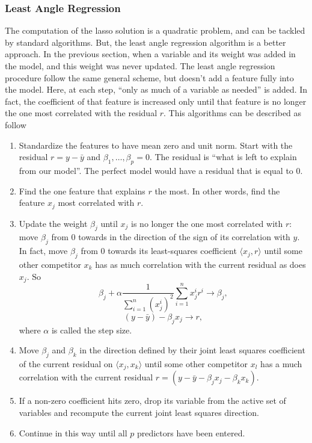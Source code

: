 \documentclass[a4paper,12pt]{article}
\begin{document}
\subsubsection{Least Angle Regression}
The computation of the lasso solution is a quadratic problem, and can be tackled by standard algorithms. But, the least angle regression algorithm is a better approach. In the previous section, when a variable and its weight was added in the model, and this weight was never updated. The least angle regression procedure follow the same general scheme, but doesn't add a feature fully into the model. Here, at each step, ``only as much of a variable as needed'' is added. In fact, the coefficient of that feature is increased only until that feature is no longer the one most correlated with the residual $r$. This algorithms can be described as follow
\begin{enumerate}
\item Standardize the features to have mean zero and unit norm. Start with the residual $r = y - \bar{y}$ and $\beta_1, \ldots, \beta_p = 0$. The residual is ``what is left to explain from our model''. The perfect model would have a residual that is equal to $0$.
\item Find the one feature that explains $r$ the most. In other words, find the feature $x_j$ most correlated with $r$.
\item Update the weight $\beta_j$ until $x_j$ is no longer the one most correlated with $r$: move $\beta_j$ from $0$ towards in the direction of the sign of its correlation with $y$. In fact, move $\beta_j$ from $0$ towards its least-squares coefficient $\langle x_j, r \rangle$ until some other competitor $x_k$ has as much correlation with the current residual as does $x_j$. So
\[ \beta_j + \alpha \frac{1}{\sum_{i=1}^n (x_j^i)^2} \sum_{i=1}^n x_j^i r^i \to \beta_j,\]
\[ (y - \bar{y}) - \beta_j x_j \to r,\]
where $\alpha$ is called the step size.
\item Move $\beta_j$ and $\beta_k$ in the direction defined by their joint least squares coefficient of the current residual on $\langle x_j, x_k \rangle$ until some other competitor $x_l$ has a much correlation with the current residual $r = (y-\bar{y} - \beta_j x_j - \beta_k x_k)$.
\item If a non-zero coefficient hits zero, drop its variable from the active set of variables and recompute the current joint least squares direction.
\item Continue in this way until all $p$ predictors have been entered.
\end{enumerate}
\end{document}

